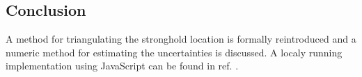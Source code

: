 \documentclass[a4paper,10pt]{article}
\begin{document}
\begin{multicols}{2}
    \section{Conclusion}

    A method for triangulating the stronghold location is formally reintroduced and a numeric method for estimating the uncertainties is discussed. A localy running implementation using JavaScript can be found in ref. \cite{repo_triang}.
\end{multicols}

\printbibliography
\end{document}
